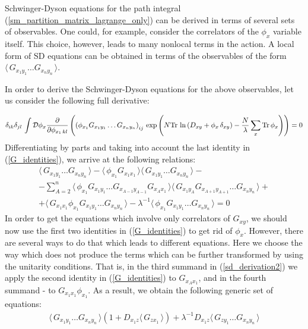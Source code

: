 \documentclass[twocolumn,showpacs,preprintnumbers,superscriptaddress,amsmath,floatfix,amssymb,secnumarabic]{revtex4}
\newcommand{\lr}[1]{ \left( #1 \right) }
\newcommand{\vev}[1]{ \langle \, #1 \, \rangle }
\newcommand{\tr}{ {\rm Tr} \, }
\newcommand{\expa}[1]{ \exp{\left( #1 \right)} }
\begin{document}
 Schwinger-Dyson equations for the path integral (\ref{sm_partition_matrix_lagrange_only}) can be derived in terms of several sets of observables. One could, for example, consider the correlators of the $\phi_x$ variable itself. This choice, however, leads to many nonlocal terms in the action. A local form of SD equations can be obtained in terms of the observables of the form $\vev{G_{x_1 y_1} \ldots G_{x_n y_n}}$.

 In order to derive the Schwinger-Dyson equations for the above observables, let us consider the following full derivative:
\begin{widetext}
\begin{eqnarray}
\label{sd_derivation1}
 \delta_{ik} \delta_{jl} \, \int\mathcal{D}\phi_x \frac{\partial}{\partial \phi_{x_1 \, kl}}
 \lr{ \lr{\phi_{x_1} G_{x_1 y_1} \ldots G_{x_n y_n}}_{ij} \,
 \expa{N \tr\ln\lr{D_{xy} + \phi_x \, \delta_{xy}} - \frac{N}{\lambda} \sum\limits_x \tr \phi_x } } = 0
\end{eqnarray}
Differentiating by parts and taking into account the last identity in (\ref{G_identities}), we arrive at the following relations:
\begin{eqnarray}
\label{sd_derivation2}
 \vev{G_{x_1 y_1} \ldots G_{x_n y_n}} - \vev{\phi_{x_1} G_{x_1 x_1}} \vev{G_{x_1 y_1} \ldots G_{x_n y_n}}
 - \nonumber \\ -
 \sum\limits_{A=2}^{n} \vev{\phi_{x_1} G_{x_1 y_1} \ldots G_{x_{A-1}y_{A-1}} G_{x_A x_1}} \vev{G_{x_1 y_A} G_{x_{A+1}y_{A+1}} \ldots G_{x_n y_n}}
 + \nonumber \\ +
 \vev{G_{x_1 x_1} \phi_{x_1} G_{x_1 y_1} \ldots G_{x_n y_n}}
 - \lambda^{-1} \vev{\phi_{x_1} G_{x_1 y_1} \ldots G_{x_n y_n} } = 0
\end{eqnarray}
In order to get the equations which involve only correlators of $G_{x y}$, we should now use the first two identities in (\ref{G_identities}) to get rid of $\phi_x$. However, there are several ways to do that which leads to different equations. Here we choose the way which does not produce the terms which can be further transformed by using the unitarity conditions. That is, in the third summand in (\ref{sd_derivation2}) we apply the second identity in (\ref{G_identities}) to $G_{x_A x_1}$, and in the fourth summand - to $G_{x_1 x_1} \phi_{x_1}$. As a result, we obtain the following generic set of equations:
\begin{eqnarray}
\label{sd_G_general}
 \vev{ G_{x_1 y_1} \ldots G_{x_n y_n} } \lr{1 + D_{x_1 z} \vev{G_{z x_1}}}
 +
 \lambda^{-1} D_{x_1 z} \vev{G_{z y_1} \ldots G_{x_n y_n}}

\end{eqnarray}
\end{widetext}
\end{document}
